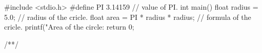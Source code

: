 #include <stdio.h>
#define PI 3.14159 // value of PI.
int main() 
{
   float radius = 5.0; // radius of the cricle.
   float area = PI * radius * radius; // formula of the cricle.
   printf("Area of the circle: %
   return 0;
}

/**/